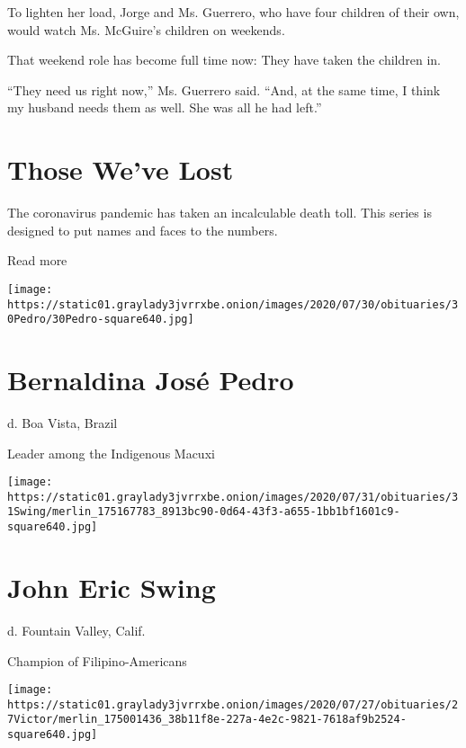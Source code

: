 To lighten her load, Jorge and Ms. Guerrero, who have four children of
their own, would watch Ms. McGuire's children on weekends.

That weekend role has become full time now: They have taken the children
in.

``They need us right now,'' Ms. Guerrero said. ``And, at the same time,
I think my husband needs them as well. She was all he had left.''

\href{https://www.nytimes3xbfgragh.onion/interactive/2020/obituaries/people-died-coronavirus-obituaries.html?action=click\&pgtype=Article\&state=default\&region=BELOW_MAIN_CONTENT\&context=covid_obits_promo}{}

\hypertarget{those-weve-lost}{%
\section{Those We've Lost}\label{those-weve-lost}}

The coronavirus pandemic has taken an incalculable death toll. This
series is designed to put names and faces to the numbers.

Read more

\texttt{[image: https://static01.graylady3jvrrxbe.onion/images/2020/07/30/obituaries/30Pedro/30Pedro-square640.jpg]}

\hypertarget{bernaldina-josuxe9-pedro}{%
\section{Bernaldina José Pedro}\label{bernaldina-josuxe9-pedro}}

d. Boa Vista, Brazil

Leader among the Indigenous Macuxi

\texttt{[image: https://static01.graylady3jvrrxbe.onion/images/2020/07/31/obituaries/31Swing/merlin\_175167783\_8913bc90-0d64-43f3-a655-1bb1bf1601c9-square640.jpg]}

\hypertarget{john-eric-swing}{%
\section{John Eric Swing}\label{john-eric-swing}}

d. Fountain Valley, Calif.

Champion of Filipino-Americans

\texttt{[image: https://static01.graylady3jvrrxbe.onion/images/2020/07/27/obituaries/27Victor/merlin\_175001436\_38b11f8e-227a-4e2c-9821-7618af9b2524-square640.jpg]}

